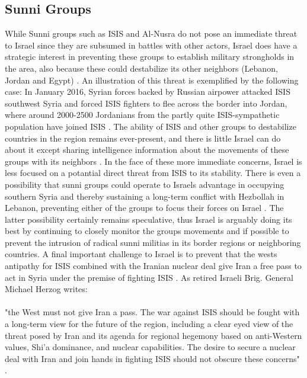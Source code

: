 \documentclass[a4paper]{article}\twocolumn
\begin{document}
\subsection{Sunni Groups}
While Sunni groups such as ISIS and Al-Nusra do not pose an immediate threat to Israel since they are subsumed in battles with other actors, Israel does have a strategic interest in preventing these groups to establish military strongholds in the area, also because these could destabilize its other neighbors (Lebanon, Jordan and Egypt) \cite{Hanauer2015}. An illustration of this threat is exemplified by the following case: In January 2016, Syrian forces backed by Russian airpower attacked ISIS southwest Syria and forced ISIS fighters to flee across the border into Jordan, where around 2000-2500 Jordanians from the partly quite ISIS-sympathetic population have joined ISIS \cite{magid_2016,schenker_2016,Hanauer2015}. The ability of ISIS and other groups to destabilize countries in the region remains ever-present, and there is little Israel can do about it except sharing intelligence information about the movements of these groups with its neighbors \cite{Hanauer2015}. In the face of these more immediate concerns, Israel is less focused on a potantial direct threat from ISIS to its stability. There is even a possibility that sunni groups could operate to Israels advantage in occupying southern Syria and thereby sustaining a long-term conflict with Hezbollah in Lebanon, preventing either of the groups to focus their forces on Israel \cite{Hanauer2015}. The latter possibility certainly remains speculative, thus Israel is arguably doing its best by continuing to closely monitor the groups movements and if possible to prevent the intrusion of radical sunni militias in its border regions or neighboring countries. A final important challenge to Israel is to prevent that the wests antipathy for ISIS combined with the Iranian nuclear deal give Iran a free pass to act in Syria under the premise of fighting ISIS \cite{Hanauer2015}. As retired Israeli Brig. General Michael Herzog writes:\\\\ "the West must
not give Iran a pass. The war against ISIS should be fought with a long-term view for the future of the region, including a clear eyed view of the threat posed by Iran and its agenda for regional hegemony based on anti-Western values, Shi’a dominance, and nuclear capabilities. The desire to secure a nuclear deal with Iran and join hands in fighting ISIS should not obscure these concerns" \cite{Herzog2015}. 
\end{document}
